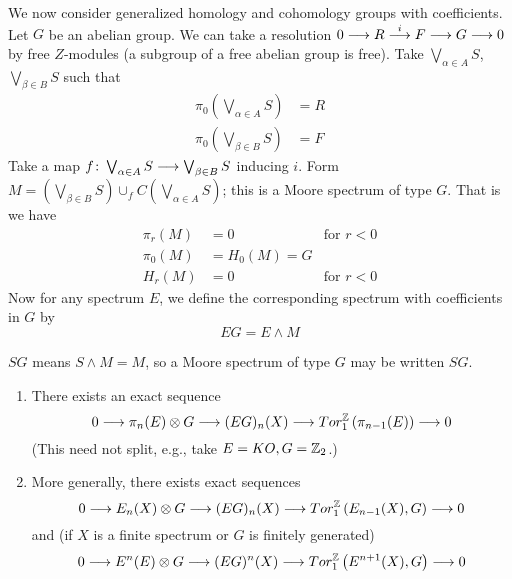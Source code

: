 \documentclass[../main]{subfiles}
\begin{document}
We now consider generalized homology and cohomology groups with coefficients. Let $G$ be an abelian group. We can take a resolution $0\longrightarrow R \overset{i}{\longrightarrow} F \longrightarrow G \longrightarrow 0$ by free $Z$-modules (a subgroup of a free abelian group is free). Take $\bigvee_{\alpha\in A} S$, $\bigvee_{\beta\in B} S$ such that
\begin{align}
    \pi_0 \left(\bigvee_{\alpha\in A} S \right) &= R \nonumber \\
    \pi_0 \left(\bigvee_{\beta \in B} S \right) &= F \nonumber
\end{align}
Take a map $f\colon \bigvee_{\alpha\in A} S \longrightarrow \bigvee_{\beta \in B} S$ inducing $i$. Form $M=\left( \bigvee_{\beta\in B} S \right) \cup_f C\left( \bigvee_{\alpha\in A} S \right)$; this is a Moore spectrum of type $G$. That is we have
\begin{align}
    \pi_r(M) &= 0 &\text{for } r<0 \nonumber \\
    \pi_0(M) &=H_0(M)=G \nonumber \\
    H_r(M) &=0 &\text{for } r<0 \nonumber
\end{align}
Now for any spectrum $E$, we define the corresponding spectrum with coefficients in $G$ by
\[EG=E\wedge M\]

\begin{example}
$SG$ means $S\wedge M = M$, so a Moore spectrum of type $G$ may be written $SG$.
\end{example}

\begin{proposition}\label{prop:p3c06.6}
\begin{enumerate}
    \item There exists an exact sequence
    \[0\longrightarrow \pi_n(E)\otimes G \longrightarrow (EG)_n(X)\longrightarrow Tor_1^{\mathbb{Z}} \left(\pi_{n-1}(E)\right) \longrightarrow 0\]
    (This need not split, e.g., take $E=KO, G=\mathbb{Z}_2$.)
    \item More generally, there exists exact sequences
    \[0\longrightarrow E_n(X)\otimes G \longrightarrow (EG)_n(X)\longrightarrow Tor_1^{\mathbb{Z}} \left(E_{n-1}(X), G\right) \longrightarrow 0\]
    and (if $X$ is a finite spectrum or $G$ is finitely generated)
    \[0\longrightarrow E^n(E)\otimes G \longrightarrow (EG)^n(X)\longrightarrow Tor_1^{\mathbb{Z}} \left(E^{n+1}(X), G\right) \longrightarrow 0\]
\end{enumerate}
\end{proposition}
\end{document}
